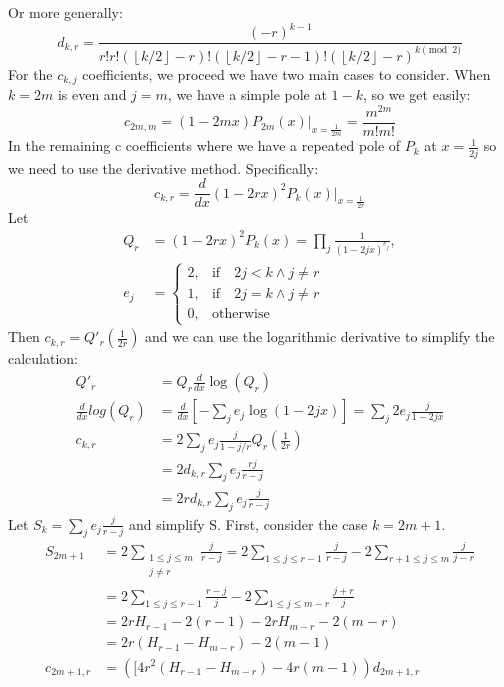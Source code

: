 \documentclass{article}
\newcommand{\floor}[1]{\left\lfloor #1 \right\rfloor}
\begin{document}
Or more generally:
$$
d_{k,r}=\frac{(-r)^{k-1}}{r! r!(\floor{k/2}-r)!(\floor{k/2}-r-1)!(\floor{k/2}-r)^{k \pmod 2}}
$$
For the $c_{k,j}$ coefficients, we proceed we have two main cases to consider. When $k=2m$ is even and $j=m$, we have a simple pole at $1-k$, so we get easily:
$$
c_{2m,m} = (1-2mx)P_{2m}(x)|_{x=\frac{1}{2m}} = \frac{m^{2m}}{m!m!}
$$
In the remaining c coefficients where  we have a repeated pole of $P_k$ at $x=\frac{1}{2j}$ so we need to use the derivative method. Specifically:
$$
c_{k,r} = \frac{d}{dx} (1-2rx)^2P_k(x)\bigg|_{x=\frac{1}{2r}}
$$
Let 
$$
\begin{aligned}
Q_r &= (1-2rx)^2 P_k(x) = \prod_{j} \frac{1}{(1-2jx)^{e_j}},\\
e_j &= 
    \begin{cases} 
    2,& \mathrm{if}\quad 2j < k \land  j \neq r \\ 
    1, & \mathrm{if} \quad 2j = k \land j \neq r \\
    0, & \mathrm{otherwise}
    \end{cases}
\end{aligned}
$$
Then $c_{k,r} = Q'_r\left (\frac{1}{2r} \right)$ and we can use the logarithmic derivative to simplify the calculation:
$$ 
\begin{aligned}
Q'_r &= Q_r\frac{d}{dx}\log(Q_r) \\
    \frac{d}{dx}log(Q_r) &= \frac{d}{dx}\left[ -\sum_{j} e_j\log(1-2jx) \right]=  \sum_{j} 2e_j\frac{j}{1-2jx}  \\
    c_{k,r} &= 2\sum_{j} e_j\frac{j}{1-j/r} Q_r\left(\frac{1}{2r}\right) \\ &= 2 d_{k,r}\sum_{j}e_j\frac{rj }{r-j} \\
    &= 2r d_{k,r}\sum_{j}e_j \frac{j}{r-j}
\end{aligned}
$$
Let $S_k=\sum_{j}e_j\frac{j}{r-j}$ and simplify S. First, consider the case $k=2m+1$. 
$$
\begin{aligned}
    S_{2m+1} &= 2\sum_{\substack{1 \leq j \leq m \\ j \neq r}}\frac{j}{r-j} = 2 \sum_{1 \leq j \leq r-1} \frac{j}{r-j} - 2\sum_{r+1 \leq j \leq m}\frac{j}{j-r} \\
    &= 2\sum_{1 \leq j \leq r-1}\frac{r-j}{j} -2\sum_{1 \leq j \leq m-r}\frac{j+r}{j} \\
    &= 2rH_{r-1}-2(r-1)-2rH_{m-r}-2(m-r) \\
    &= 2r(H_{r-1}-H_{m-r})-2(m-1) \\
    c_{2m+1,r} &= ([4r^2(H_{r-1}-H_{m-r})-4r(m-1))d_{2m+1,r}
\end{aligned}
$$
\end{document}
